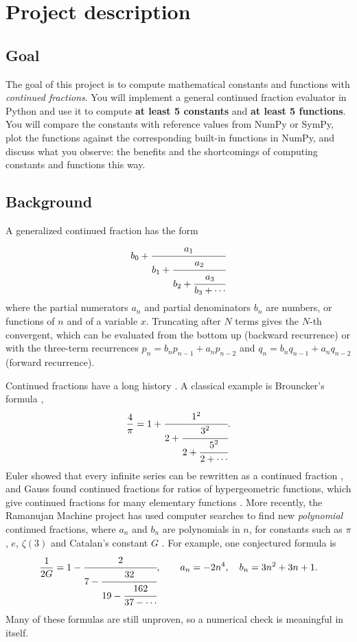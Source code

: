 \documentclass[11pt,a4paper]{article}
\begin{document}
\section*{Project description}
\subsection*{Goal}
The goal of this project is to compute mathematical constants and functions
with \emph{continued fractions}. You will implement a general continued
fraction evaluator in Python and use it to compute \textbf{at least 5
constants} and \textbf{at least 5 functions}. You will compare the constants
with reference values from NumPy or SymPy, plot the functions against the
corresponding built-in functions in NumPy, and discuss what you observe: the
benefits and the shortcomings of computing constants and functions this way.

\subsection*{Background}
A generalized continued fraction has the form
\begin{equation*}
  b_0 + \cfrac{a_1}{b_1 + \cfrac{a_2}{b_2 + \cfrac{a_3}{b_3 + \dotsb}}}
\end{equation*}
where the partial numerators $a_n$ and partial denominators $b_n$ are numbers,
or functions of $n$ and of a variable $x$. Truncating after $N$ terms gives the
$N$-th convergent, which can be evaluated from the bottom up (backward
recurrence) or with the three-term recurrences $p_n = b_n p_{n-1} + a_n
p_{n-2}$ and $q_n = b_n q_{n-1} + a_n q_{n-2}$ (forward recurrence).

Continued fractions have a long history \cite{baez}. A classical example is
Brouncker's formula \cite{brouncker},
\begin{equation*}
  \frac{4}{\pi} = 1 + \cfrac{1^2}{2 + \cfrac{3^2}{2 + \cfrac{5^2}{2 + \dotsb}}}.
\end{equation*}
Euler showed that every infinite series can be rewritten as a continued
fraction \cite{euler}, and Gauss found continued fractions for ratios of
hypergeometric functions, which give continued fractions for many elementary
functions \cite{baez}. More recently, the Ramanujan Machine project has used
computer searches to find new \emph{polynomial} continued fractions, where
$a_n$ and $b_n$ are polynomials in $n$, for constants such as $\pi$, $e$,
$\zeta(3)$ and Catalan's constant $G$ \cite{nature,results}. For example, one
conjectured formula is \cite{catalan}
\begin{equation*}
  \frac{1}{2G} = 1 - \cfrac{2}{7 - \cfrac{32}{19 - \cfrac{162}{37 - \dotsb}}},
  \qquad a_n = -2n^4, \quad b_n = 3n^2 + 3n + 1.
\end{equation*}
Many of these formulas are still unproven, so a numerical check is
meaningful in itself.
\end{document}

